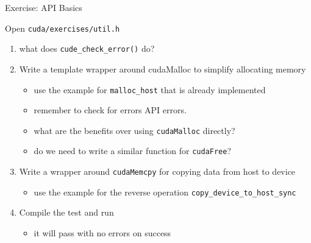 \documentclass[aspectratio=43]{beamer}
\newcommand{\lst}[1]{\lstinline!#1!}
\begin{document}
\begin{frame}[fragile]{Exercise: API Basics}

    Open \lst{cuda/exercises/util.h}
    \begin{enumerate}
        \item what does \lst{cude_check_error()} do?

        \item Write a template wrapper around cudaMalloc to simplify allocating memory
        \begin{itemize}
            \item use the example for \lst{malloc_host} that is already implemented
            \item remember to check for errors API errors.
            \item what are the benefits over using \lst{cudaMalloc} directly?
            \item do we need to write a similar function for \lst{cudaFree}?
        \end{itemize}

        \item Write a wrapper around \lst{cudaMemcpy} for copying data from host to device
        \begin{itemize}
            \item use the example for the reverse operation \lst{copy_device_to_host_sync}
        \end{itemize}

        \item Compile the test and run
        \begin{itemize}
            \item it will pass with no errors on success
        \end{itemize}
    \end{enumerate}

\end{frame}

\end{document}
